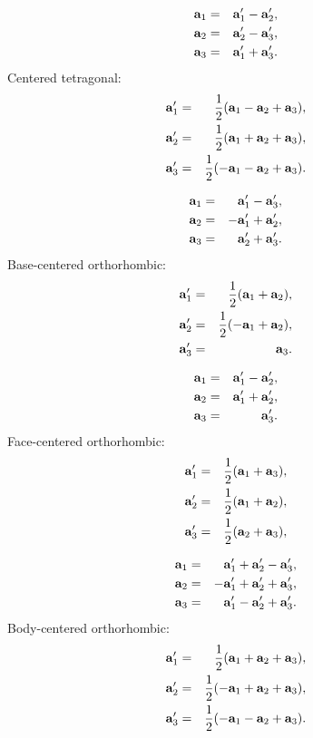 \documentclass[12pt,a4paper,twoside]{report}
\begin{document}
\begin{eqnarray}
{\bf a}_1&=&  {\bf a}_1' - {\bf a}_2', \\
{\bf a}_2&=&  {\bf a}_2' - {\bf a}_3', \\
{\bf a}_3&=& {\bf a}_1' + {\bf a}_3'.
\end{eqnarray}
Centered tetragonal:
\begin{eqnarray}
{\bf a}_1'&=&{1\over 2} ({\bf a}_1 - {\bf a}_2 + {\bf a}_3), \\
{\bf a}_2'&=&{1\over 2} ({\bf a}_1 + {\bf a}_2 + {\bf a}_3), \\
{\bf a}_3'&=&{1\over 2} (-{\bf a}_1 - {\bf a}_2 + {\bf a}_3). 
\end{eqnarray}

\begin{eqnarray}
{\bf a}_1&=&  {\bf a}_1' - {\bf a}_3', \\
{\bf a}_2&=& -{\bf a}_1' + {\bf a}_2', \\
{\bf a}_3&=& {\bf a}_2' + {\bf a}_3'.
\end{eqnarray}
Base-centered orthorhombic:
\begin{eqnarray}
{\bf a}_1'&=&{1\over 2} ({\bf a}_1 + {\bf a}_2), \\
{\bf a}_2'&=&{1\over 2} (-{\bf a}_1 + {\bf a}_2), \\
{\bf a}_3'&=&{\bf a}_3. 
\end{eqnarray}

\begin{eqnarray}
{\bf a}_1&=&  {\bf a}_1' - {\bf a}_2', \\
{\bf a}_2&=&  {\bf a}_1' + {\bf a}_2', \\
{\bf a}_3&=& {\bf a}_3'.
\end{eqnarray}
Face-centered orthorhombic:
\begin{eqnarray}
{\bf a}_1'&=&{1\over 2} ({\bf a}_1 + {\bf a}_3), \\
{\bf a}_2'&=&{1\over 2} ({\bf a}_1 + {\bf a}_2), \\
{\bf a}_3'&=&{1\over 2} ({\bf a}_2 + {\bf a}_3), \\
\end{eqnarray}

\begin{eqnarray}
{\bf a}_1&=&  {\bf a}_1' + {\bf a}_2' - {\bf a}_3', \\
{\bf a}_2&=& -{\bf a}_1' + {\bf a}_2' + {\bf a}_3', \\
{\bf a}_3&=&  {\bf a}_1' - {\bf a}_2' + {\bf a}_3'.
\end{eqnarray}
Body-centered orthorhombic:
\begin{eqnarray}
{\bf a}_1'&=&{1\over 2} ({\bf a}_1 + {\bf a}_2 + {\bf a}_3), \\
{\bf a}_2'&=&{1\over 2} (-{\bf a}_1 + {\bf a}_2 + {\bf a}_3), \\
{\bf a}_3'&=&{1\over 2} (-{\bf a}_1 - {\bf a}_2 + {\bf a}_3). 
\end{eqnarray}
\end{document}
